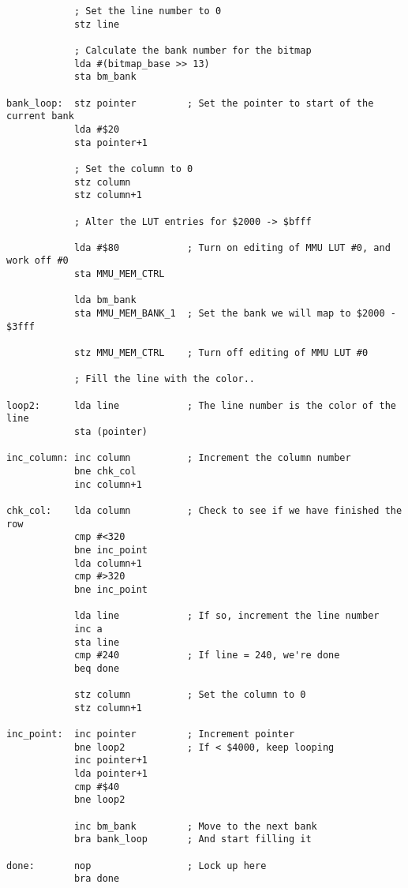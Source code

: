 \begin{verbatim}
            ; Set the line number to 0
            stz line

            ; Calculate the bank number for the bitmap
            lda #(bitmap_base >> 13)
            sta bm_bank

bank_loop:  stz pointer         ; Set the pointer to start of the current bank
            lda #$20
            sta pointer+1

            ; Set the column to 0
            stz column
            stz column+1

            ; Alter the LUT entries for $2000 -> $bfff

            lda #$80            ; Turn on editing of MMU LUT #0, and work off #0
            sta MMU_MEM_CTRL

            lda bm_bank
            sta MMU_MEM_BANK_1  ; Set the bank we will map to $2000 - $3fff

            stz MMU_MEM_CTRL    ; Turn off editing of MMU LUT #0

            ; Fill the line with the color..

loop2:      lda line            ; The line number is the color of the line
            sta (pointer)

inc_column: inc column          ; Increment the column number
            bne chk_col
            inc column+1

chk_col:    lda column          ; Check to see if we have finished the row
            cmp #<320
            bne inc_point
            lda column+1
            cmp #>320
            bne inc_point

            lda line            ; If so, increment the line number
            inc a
            sta line
            cmp #240            ; If line = 240, we're done
            beq done

            stz column          ; Set the column to 0
            stz column+1

inc_point:  inc pointer         ; Increment pointer
            bne loop2           ; If < $4000, keep looping
            inc pointer+1
            lda pointer+1
            cmp #$40
            bne loop2

            inc bm_bank         ; Move to the next bank
            bra bank_loop       ; And start filling it

done:       nop                 ; Lock up here
            bra done
\end{verbatim}
